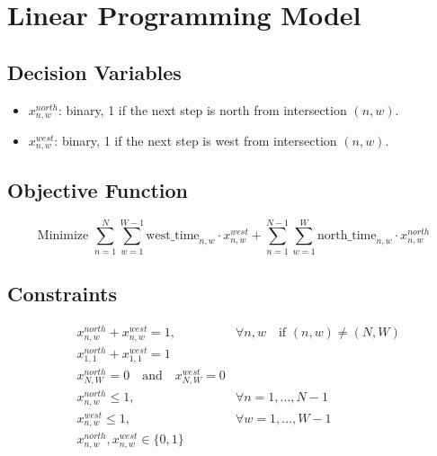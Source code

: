 \documentclass{article}
\begin{document}
\section*{Linear Programming Model}

\subsection*{Decision Variables}
\begin{itemize}
    \item \( x_{n,w}^{north} \): binary, 1 if the next step is north from intersection \( (n, w) \).
    \item \( x_{n,w}^{west} \): binary, 1 if the next step is west from intersection \( (n, w) \).
\end{itemize}

\subsection*{Objective Function}
\[
\text{Minimize } \sum_{n=1}^{N}\sum_{w=1}^{W-1} \text{west\_time}_{n,w} \cdot x_{n,w}^{west} + \sum_{n=1}^{N-1}\sum_{w=1}^{W} \text{north\_time}_{n,w} \cdot x_{n,w}^{north}
\]

\subsection*{Constraints}
\begin{align*}
    & x_{n,w}^{north} + x_{n,w}^{west} = 1, & \forall n, w \quad \text{if } (n, w) \neq (N, W) \\
    & x_{1,1}^{north} + x_{1,1}^{west} = 1 \\
    & x_{N,W}^{north} = 0 \quad \text{and} \quad x_{N,W}^{west} = 0 \\
    & x_{n,w}^{north} \leq 1, & \forall n = 1, \ldots, N-1 \\
    & x_{n,w}^{west} \leq 1, & \forall w = 1, \ldots, W-1 \\
    & x_{n,w}^{north}, x_{n,w}^{west} \in \{0, 1\}
\end{align*}
\end{document}
